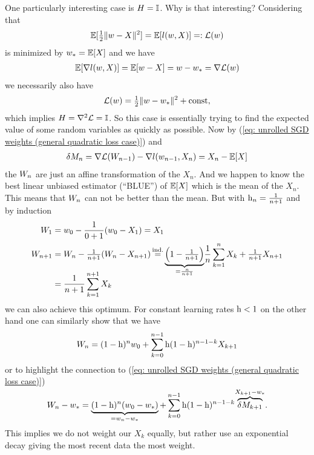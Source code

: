 One particularly interesting case is \(H=\mathbb{I}\). Why is that interesting?
Considering that
\begin{align*}
	\mathbb{E}[\tfrac12\|w-X\|^2]=\mathbb{E}[l(w,X)]=:\mathcal{L}(w)
\end{align*}
is minimized by \(w_*=\mathbb{E}[X]\) and we have
\begin{align*}
	\mathbb{E}[\nabla l(w,X)]
	=\mathbb{E}[w-X]=w- w_*=\nabla\mathcal{L}(w)
\end{align*}
we necessarily also have
\begin{align*}
	\mathcal{L}(w) = \tfrac12\|w-w_*\|^2 + \text{const},
\end{align*}
which implies \(H=\nabla^2\mathcal{L}=\mathbb{I}\). So this case is essentially
trying to find the expected value of some random variables as quickly as
possible. Now by (\ref{eq: unrolled SGD weights (general
quadratic loss case)}) and
\begin{align*}
	\delta M_n = \nabla\mathcal{L}(W_{n-1}) -\nabla l(w_{n-1}, X_n)
	= X_n - \mathbb{E}[X]
\end{align*}
the \(W_n\) are just an affine transformation of the \(X_n\). And we
happen to know the best linear unbiased estimator (``BLUE'') of \(\mathbb{E}[X]\)
which is the mean of the \(X_n\). This means that \(W_n\) can not be
better than the mean. But with \(\text{h}_n=\frac1{n+1}\) and by induction
\begin{align}
	\label{eq: getting rid of w_0 first step}
	\Weights_1 &= \weights_0 - \frac{1}{0+1}(\weights_0 - X_1) = X_1\\
	\nonumber
	\Weights_{n+1}
	&= \Weights_n - \tfrac{1}{n+1}(\Weights_n - X_{n+1})
	\xeq{\text{ind.}}\smash{\underbrace{\left(1-\tfrac1{n+1}\right)}_{=\frac{n}{n+1}}}
	\frac1n\sum_{k=1}^n X_k + \tfrac{1}{n+1}X_{n+1}\\
	\nonumber
	&= \frac{1}{n+1}\sum_{k=1}^{n+1}X_k
\end{align}
we can also achieve this optimum. For constant learning rates \(\text{h}<1\) on the
other hand one can similarly show that we have
\begin{align*}
	W_n = (1-\text{h})^nw_0 + \sum_{k=0}^{n-1}\text{h}(1-\text{h})^{n-1-k}X_{k+1}
\end{align*}
or to highlight the connection to (\ref{eq: unrolled SGD weights (general
quadratic loss case)})
\begin{align*}
	W_n - w_*
	= \underbrace{(1-\text{h})^n(w_0 -w_*)}_{=w_n-w_*}
	+ \sum_{k=0}^{n-1}\text{h}(1-\text{h})^{n-1-k}
	\smash{\overbrace{\delta M_{k+1}}^{X_{k+1}-w_*}}.
\end{align*}
This implies we do not weight our \(X_k\) equally, but rather use an
exponential decay giving the most recent data the most weight.

